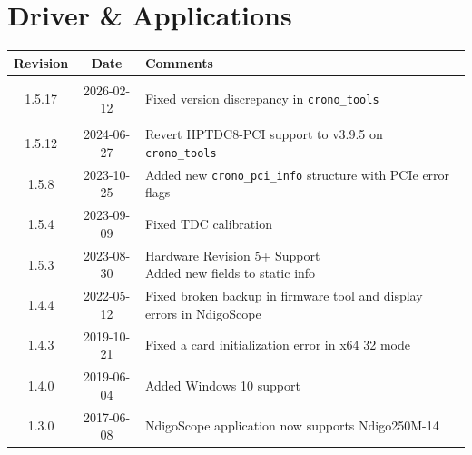 \section{Driver \& Applications}
\begin{tabularx}{\textwidth}{|c|c|X|}
    \hline
    Revision & Date & Comments\\
    \hline\hline
    \hypertarget{drvrev}{1.5.17} & 2026-02-12 & Fixed version discrepancy in \texttt{crono\_tools}\\
    \hline
    1.5.12 & 2024-06-27 & Revert HPTDC8-PCI support to v3.9.5 on \texttt{crono\_tools}\\
    \hline
    1.5.8 & 2023-10-25 & Added new \texttt{crono\_pci\_info} structure with PCIe error flags\\
    \hline
    1.5.4 & 2023-09-09 & Fixed TDC calibration\\
    \hline
    1.5.3 & 2023-08-30 & 
        \makecell[l]{
            Hardware Revision 5+ Support\\
            Added new fields to static info\\
        }
    \\
    \hline
    1.4.4 & 2022-05-12 & Fixed broken backup in firmware tool and display errors in NdigoScope\\
    \hline
    1.4.3 & 2019-10-21 & Fixed a card initialization error in x64 32 mode\\
    \hline
    1.4.0 & 2019-06-04 & Added Windows 10 support\\
    \hline
    1.3.0 & 2017-06-08 & NdigoScope application now supports Ndigo250M-14\\
    \hline
\end{tabularx}
